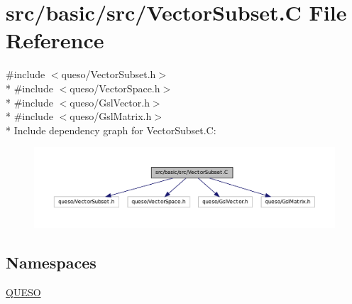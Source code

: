 \hypertarget{_vector_subset_8_c}{\section{src/basic/src/\-Vector\-Subset.C File Reference}
\label{_vector_subset_8_c}
}
{\ttfamily \#include $<$queso/\-Vector\-Subset.\-h$>$}\\*
{\ttfamily \#include $<$queso/\-Vector\-Space.\-h$>$}\\*
{\ttfamily \#include $<$queso/\-Gsl\-Vector.\-h$>$}\\*
{\ttfamily \#include $<$queso/\-Gsl\-Matrix.\-h$>$}\\*
Include dependency graph for Vector\-Subset.\-C\-:
\nopagebreak
\begin{figure}[H]
\begin{center}
\leavevmode
\includegraphics[width=350pt]{_vector_subset_8_c__incl}
\end{center}
\end{figure}
\subsection*{Namespaces}
\begin{DoxyCompactItemize}
\item 
\hyperlink{namespace_q_u_e_s_o}{Q\-U\-E\-S\-O}
\end{DoxyCompactItemize}
